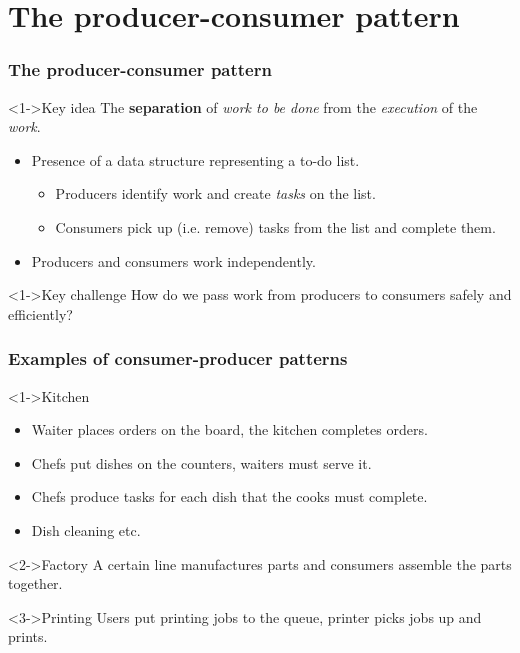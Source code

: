 \documentclass[xcolor={dvipsnames,svgnames},aspectratio=169]{beamer}
\begin{document}
\section{The producer-consumer pattern}

\begin{frame}[fragile]
  \frametitle{The producer-consumer pattern}

  \begin{block}<1->{\faLightbulb \quad Key idea}
    The \textbf{separation} of \emph{work to be done} from the \emph{execution}
    of the \emph{work}.
  \end{block}

  \begin{itemize}
  \item[\faBook]<1-> Presence of a data structure representing a to-do list.
    \begin{itemize}
    \item[\faBook]<1-> Producers identify work and create \emph{tasks} on the list.
    \item[\faBook]<1-> Consumers pick up (i.e. remove) tasks from the list and
      complete them.
    \end{itemize}
  \item[\faBook]<1-> Producers and consumers work independently.
  \end{itemize}

    \begin{block}<1->{\faPuzzlePiece \quad Key challenge}
      How do we pass work from producers to consumers safely and efficiently?
  \end{block}
\end{frame}

\begin{frame}[fragile]
  \frametitle{Examples of consumer-producer patterns}

  \begin{block}<1->{\faCookie \quad Kitchen}
    \begin{itemize}
    \item[\faBook] Waiter places orders on the board, the kitchen completes
      orders.
    \item[\faBook] Chefs put dishes on the counters, waiters must serve it.
    \item[\faBook] Chefs produce tasks for each dish that the cooks must
      complete.
    \item[\faBook] Dish cleaning etc.
    \end{itemize}
  \end{block}
  \vspace{0.2cm}
  \begin{block}<2->{\faSearch \quad Factory}
    A certain line manufactures parts and consumers assemble the parts together.
  \end{block}
    \vspace{0.2cm}
  \begin{block}<3->{\faPrint \quad Printing}
    Users put printing jobs to the queue, printer picks jobs up and prints.
  \end{block}
\end{frame}
\end{document}
